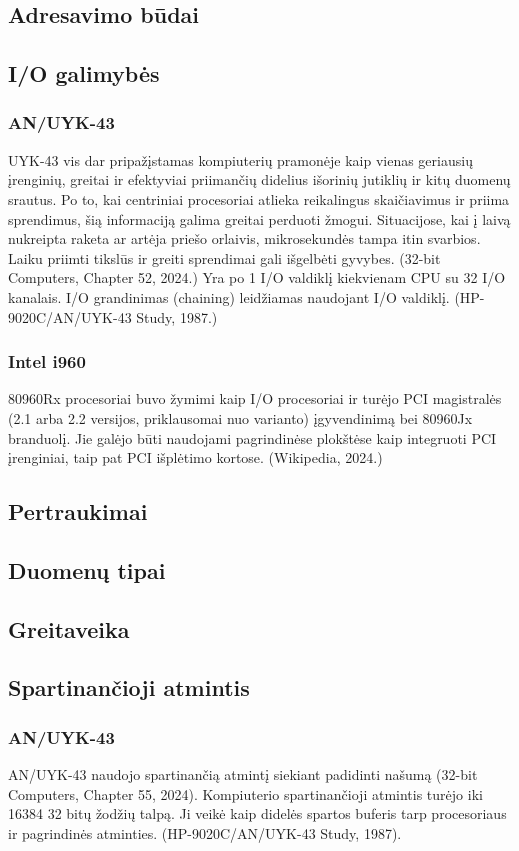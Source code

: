 \documentclass{article}
\begin{document}
\subsection{Adresavimo būdai}
\subsection{I/O galimybės}
\subsubsection{AN/UYK-43}
UYK-43 vis dar pripažįstamas kompiuterių pramonėje kaip vienas geriausių įrenginių, greitai ir efektyviai priimančių didelius išorinių jutiklių ir kitų duomenų srautus. Po to, kai centriniai procesoriai atlieka reikalingus skaičiavimus ir priima sprendimus, šią informaciją galima greitai perduoti žmogui. Situacijose, kai į laivą nukreipta raketa ar artėja priešo orlaivis, mikrosekundės tampa itin svarbios. Laiku priimti tikslūs ir greiti sprendimai gali išgelbėti gyvybes. (32-bit Computers, Chapter 52, 2024.) Yra  po 1 I/O valdiklį kiekvienam CPU su 32 I/O kanalais. I/O grandinimas (chaining) leidžiamas naudojant I/O valdiklį. (HP-9020C/AN/UYK-43 Study, 1987.)
\subsubsection{Intel i960}
80960Rx procesoriai buvo žymimi kaip I/O procesoriai ir turėjo PCI magistralės (2.1 arba 2.2 versijos, priklausomai nuo varianto) įgyvendinimą bei 80960Jx branduolį. Jie galėjo būti naudojami pagrindinėse plokštėse kaip integruoti PCI įrenginiai, taip pat PCI išplėtimo kortose. (Wikipedia, 2024.)
\subsection{Pertraukimai}
\subsection{Duomenų tipai}
\subsection{Greitaveika}
\subsection{Spartinančioji atmintis}
\subsubsection{AN/UYK-43}
AN/UYK-43 naudojo spartinančią atmintį siekiant padidinti našumą (32-bit Computers, Chapter 55, 2024). Kompiuterio spartinančioji atmintis turėjo iki 16384 32 bitų žodžių talpą. Ji veikė kaip didelės spartos buferis tarp procesoriaus ir pagrindinės atminties. (HP-9020C/AN/UYK-43 Study, 1987).
\end{document}
